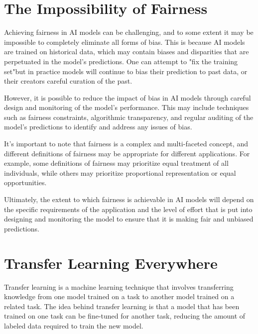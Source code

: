 \section{The Impossibility of Fairness}

Achieving fairness in AI models can be challenging, and to some extent it may be impossible to completely eliminate all forms of bias. This is because AI models are trained on historical data, which may contain biases and disparities that are perpetuated in the model's predictions. One can attempt to "fix the training set"but in practice models will continue to bias their prediction to past data, or their creators careful curation of the past. 

However, it is possible to reduce the impact of bias in AI models through careful design and monitoring of the model's performance. This may include techniques such as fairness constraints, algorithmic transparency, and regular auditing of the model's predictions to identify and address any issues of bias.

It's important to note that fairness is a complex and multi-faceted concept, and different definitions of fairness may be appropriate for different applications. For example, some definitions of fairness may prioritize equal treatment of all individuals, while others may prioritize proportional representation or equal opportunities.

Ultimately, the extent to which fairness is achievable in AI models will depend on the specific requirements of the application and the level of effort that is put into designing and monitoring the model to ensure that it is making fair and unbiased predictions.

\section{Transfer Learning Everywhere}

Transfer learning is a machine learning technique that involves transferring knowledge from one model trained on a task to another model trained on a related task. The idea behind transfer learning is that a model that has been trained on one task can be fine-tuned for another task, reducing the amount of labeled data required to train the new model.

